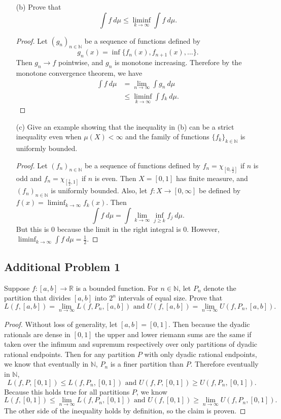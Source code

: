 \documentclass[12pt]{article}
\newcommand{\R}{\mathbb{R}}
\newcommand{\N}{\mathbb{N}}
\newcommand{\eq}[1]{\begin{equation*}#1\end{equation*}}
\newcommand{\al}[1]{\begin{align*}#1\end{align*}}
\begin{document}
\begin{itemize}
    \item[(b)] Prove that \eq{\int f ~d \mu \leq \liminf_{k \to \infty} \int f ~d \mu.}
    
    \begin{proof}
        Let $(g_n)_{n \in \N}$ be a sequence of functions defined by \eq{g_n (x) = \inf \{f_n(x), f_{n+1}(x), \ldots\}.} Then $g_n \to f$ pointwise, and $g_n$ is monotone increasing. Therefore by the monotone convergence theorem, we have \al{\int f ~d \mu &= \lim_{n \to \infty} \int g_n ~d \mu \\
                          &\leq \liminf_{k \to \infty} \int f_k ~d \mu.}
    \end{proof}

    \item[(c)] Give an example showing that the inequality in (b) can be a strict inequality even when $\mu(X) < \infty$ and the family of functions $\{f_k\}_{k \in \N}$ is uniformly bounded.
    
    \begin{proof}
        Let $(f_n)_{n \in \N}$ be a sequence of functions defined by $f_n = \chi_{[0,\frac{1}{2}]}$ if $n$ is odd and $f_n = \chi_{[\frac{1}{2}, 1]}$ if $n$ is even. Then $X = [0, 1]$ has finite measure, and $(f_n)_{n \in \N}$ is uniformly bounded. Also, let $f : X \to [0, \infty]$ be defined by $f(x) = \liminf_{k \to \infty} f_k (x)$. Then \eq{\int f ~d \mu = \int \lim_{k \to \infty} \inf_{j \geq k} f_j ~d \mu.} But this is 0 because the limit in the right integral is 0. However, $\liminf_{k \to \infty} \int f ~d \mu = \frac{1}{2}$.
    \end{proof}
\end{itemize}

\subsection*{Additional Problem 1}

Suppose $f : [a, b] \to \R$ is a bounded function. For $n \in \N$, let $P_n$ denote the partition that divides $[a, b]$ into $2^n$ intervals of equal size. Prove that \eq{L(f, [a,b]) = \lim_{n\to\infty} L(f, P_n, [a,b]) \text{ and } U(f, [a,b]) = \lim_{n \to \infty} U(f, P_n, [a,b]).}

\begin{proof}
    Without loss of generality, let $[a,b] = [0,1]$. Then because the dyadic rationals are dense in $[0, 1]$ the upper and lower riemann sums are the same if taken over the infimum and supremum respectively over only partitions of dyadic rational endpoints. Then for any partition $P$ with only dyadic rational endpoints, we know that eventually in $\N$, $P_n$ is a finer partition than $P$. Therefore eventually in $\N$, \eq{L(f, P, [0,1]) \leq L(f, P_n, [0,1]) \text{ and } U(f, P, [0,1]) \geq U(f, P_n, [0,1]).} Because this holds true for all partitions $P$, we know \eq{L(f, [0,1]) \leq \lim_{n \to \infty} L(f, P_n, [0,1]) \text{ and } U(f, [0,1]) \geq \lim_{n \to \infty} U(f, P_n, [0,1]).} The other side of the inequality holds by definition, so the claim is proven.
\end{proof}
\end{document}

